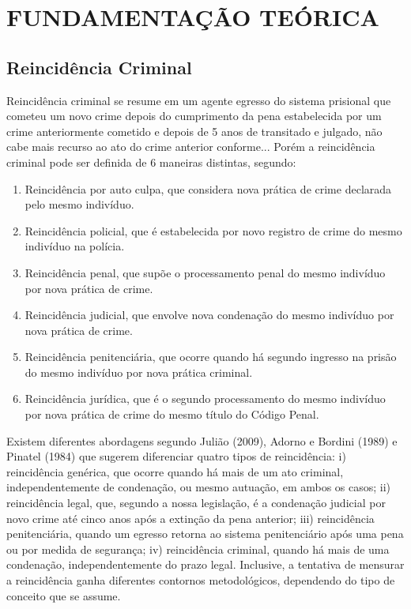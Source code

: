 \chapter{FUNDAMENTAÇÃO TEÓRICA}
\label{cap:fundamentacao-teorica}

  \section{Reincidência Criminal}
		
Reincidência criminal se resume em um agente egresso do sistema prisional que cometeu um novo crime depois do cumprimento da pena estabelecida por um crime anteriormente cometido e depois de 5 anos de transitado e julgado, não cabe mais recurso ao ato do crime anterior conforme... Porém a reincidência criminal pode ser definida de 6 maneiras distintas, segundo:

\begin{enumerate}
	\item Reincidência por auto culpa, que considera nova prática de crime declarada pelo mesmo indivíduo. 
	\item Reincidência policial, que é estabelecida por novo registro de crime do mesmo indivíduo na polícia. 
	\item Reincidência penal, que supõe o processamento penal do mesmo indivíduo por nova prática de crime. 
	\item Reincidência judicial, que envolve nova condenação do mesmo indivíduo por nova prática de crime. 
	\item Reincidência penitenciária, que ocorre quando há segundo ingresso na prisão do mesmo indivíduo por nova prática criminal.
	\item Reincidência jurídica, que é o segundo processamento do mesmo indivíduo por nova prática de crime do mesmo título do Código Penal.
\end{enumerate}		
		 
		
Existem diferentes abordagens segundo Julião (2009), Adorno e Bordini (1989) e Pinatel (1984) que sugerem diferenciar quatro tipos de reincidência: i) reincidência genérica, que ocorre quando há mais de um ato criminal, independentemente de condenação, ou mesmo autuação, em ambos os casos; ii) reincidência legal, que, segundo a nossa legislação, é a condenação judicial por novo crime até cinco anos após a extinção da pena anterior;	iii) reincidência penitenciária, quando um egresso retorna ao sistema penitenciário após uma pena ou por medida de segurança; iv) reincidência criminal, quando há mais de uma condenação, independentemente do prazo legal. Inclusive, a tentativa de mensurar a reincidência ganha diferentes contornos metodológicos, dependendo do tipo de conceito que se assume.
		
